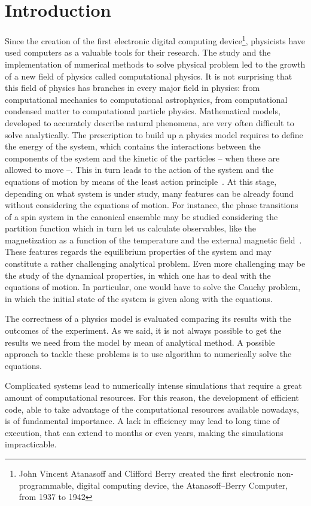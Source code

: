 \chapter{Introduction}
Since the creation of the first electronic digital computing device\footnote{John Vincent Atanasoff and Clifford Berry created the first electronic non-programmable, digital computing device, the Atanasoff–Berry Computer, from 1937 to 1942}, physicists have used computers as a valuable tools for their research. The study and the implementation of numerical methods to solve physical problem led to the growth of a new field of physics called computational physics. It is not surprising that this field of physics has branches in every major field in physics: from computational mechanics to computational astrophysics, from computational condensed matter to computational particle physics.
 Mathematical models, developed to accurately describe natural phenomena, are very often difficult to solve analytically. The prescription to build up a physics model requires to define the energy of the system, which contains the interactions between the components of the system and the kinetic of the particles -- when these are allowed to move --. This in turn leads to the action of the system and the equations of motion by means of the least action principle~\citep{LL85}. At this stage, depending on what system is under study, many features can be already found without considering the equations of motion. For instance, the phase transitions of a spin system in the canonical ensemble may be studied considering the partition function which in turn let us calculate observables, like the magnetization as a function of the temperature and the external magnetic field~\citep{Huang28}. These features regards the equilibrium properties of the system and may constitute a rather challenging analytical problem. Even more challenging may be the study of the dynamical properties, in which one has to deal with the equations of motion. In particular, one would have to solve the Cauchy problem, in which the initial state of the system is given along with the equations.

The correctness of a physics model is evaluated comparing its results with the outcomes of the experiment. As we said, it is not always possible to get the results we need from the model by mean of analytical method. A possible approach to tackle these problems is to use algorithm to numerically solve the equations.

Complicated systems lead to numerically intense simulations that require a great amount of computational resources. For this reason, the development of efficient code, able to take advantage of the computational resources available nowadays, is of fundamental importance. A lack in efficiency may lead to long time of execution, that can extend to months or even years, making the simulations impracticable. 

